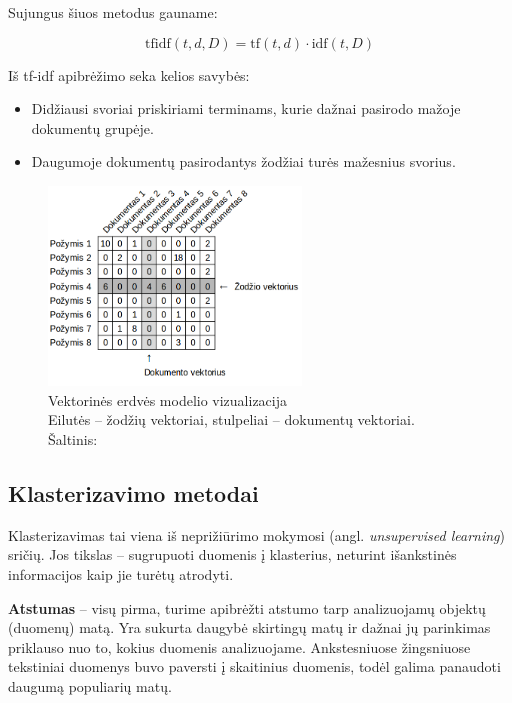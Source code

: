 \documentclass{VUMIFInfBakalaurinis}
\begin{document}
Sujungus šiuos metodus gauname:

$${\displaystyle \mathrm {tfidf} (t,d,D)=\mathrm {tf} (t,d)\cdot \mathrm {idf} (t,D)}$$

Iš tf-idf apibrėžimo seka kelios savybės:

\begin{itemize}
\item
  Didžiausi svoriai priskiriami terminams, kurie dažnai pasirodo mažoje
  dokumentų grupėje.
\item
  Daugumoje dokumentų pasirodantys žodžiai turės mažesnius svorius.
\end{itemize}

\begin{figure}[H]
	\centering
	\includegraphics[width=0.6\textwidth]{./img/image25.png}
  \caption{Vektorinės erdvės modelio vizualizacija\\
  Eilutės -- žodžių vektoriai, stulpeliai -- dokumentų vektoriai.\\
  Šaltinis: \cite{marksberry2014employee}}
\end{figure}

\subsection{Klasterizavimo metodai}\label{clustering}

Klasterizavimas tai viena iš neprižiūrimo mokymosi (angl.
\emph{unsupervised learning}) sričių. Jos tikslas -- sugrupuoti duomenis
į klasterius, neturint išankstinės informacijos kaip jie turėtų
atrodyti.

\textbf{Atstumas} -- visų pirma, turime apibrėžti atstumo tarp
  analizuojamų objektų (duomenų) matą. Yra sukurta daugybė skirtingų
  matų ir dažnai jų parinkimas priklauso nuo to, kokius duomenis
  analizuojame. Ankstesniuose žingsniuose tekstiniai duomenys buvo
  paversti į skaitinius duomenis, todėl galima panaudoti daugumą
  populiarių matų.
\end{document}
